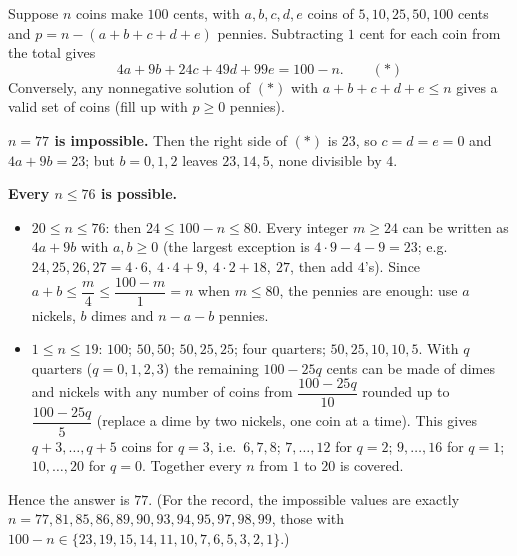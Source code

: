 Suppose $n$ coins make $100$ cents, with $a,b,c,d,e$ coins of $5,10,25,50,100$ cents and $p=n-(a+b+c+d+e)$ pennies. Subtracting $1$ cent for each coin from the total gives
\[
4a+9b+24c+49d+99e=100-n .\qquad(*)
\]
Conversely, any nonnegative solution of $(*)$ with $a+b+c+d+e\le n$ gives a valid set of coins (fill up with $p\ge0$ pennies).

\textbf{$n=77$ is impossible.} Then the right side of $(*)$ is $23$, so $c=d=e=0$ and $4a+9b=23$; but $b=0,1,2$ leaves $23,14,5$, none divisible by $4$.

\textbf{Every $n\le76$ is possible.}
\begin{itemize}
\item $20\le n\le76$: then $24\le100-n\le80$. Every integer $m\ge24$ can be written as $4a+9b$ with $a,b\ge0$ (the largest exception is $4\cdot9-4-9=23$; e.g.\ $24,25,26,27=4\cdot6,\ 4\cdot4+9,\ 4\cdot2+18,\ 27$, then add $4$'s). Since $a+b\le\dfrac {m}{4}\le\dfrac{100-m}{1}=n$ when $m\le80$, the pennies are enough: use $a$ nickels, $b$ dimes and $n-a-b$ pennies.
\item $1\le n\le19$: $100$; $50,50$; $50,25,25$; four quarters; $50,25,10,10,5$. With $q$ quarters ($q=0,1,2,3$) the remaining $100-25q$ cents can be made of dimes and nickels with any number of coins from $\dfrac{100-25q}{10}$ rounded up to $\dfrac{100-25q}{5}$ (replace a dime by two nickels, one coin at a time). This gives $q+3,\dots,q+5$ coins for $q=3$, i.e.\ $6,7,8$; $7,\dots,12$ for $q=2$; $9,\dots,16$ for $q=1$; $10,\dots,20$ for $q=0$. Together every $n$ from $1$ to $20$ is covered.
\end{itemize}
Hence the answer is $\boxed{77}$. (For the record, the impossible values are exactly $n=77,81,85,86,89,90,93,94,95,97,98,99$, those with $100-n\in\{23,19,15,14,11,10,7,6,5,3,2,1\}$.)
